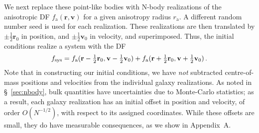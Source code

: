 \documentclass[fleqn,usenatbib]{mnras}
\begin{document}
We next replace these point-like bodies with N-body realizations of the anisotropic DF $f_\mathrm{a}(\mathbf{r}, \mathbf{v})$ for a given anisotropy radius $r_\mathrm{a}$. A different random number seed is used for each realization. These realizations are then translated by $\pm \frac{1}{2} \mathbf{r}_{0}$ in position, and $\pm \frac{1}{2} \mathbf{v}_{0}$ in velocity, and superimposed. Thus, the initial conditions realize a system with the DF
\begin{equation}
    f_\mathrm{sys} =
      f_\mathrm{a}(\mathbf{r} - \textstyle\frac{1}{2} \mathbf{r}_{0},
        \mathbf{v} - \textstyle\frac{1}{2} \mathbf{v}_{0}) +
      f_\mathrm{a}(\mathbf{r} + \textstyle\frac{1}{2} \mathbf{r}_{0},
        \mathbf{v} + \textstyle\frac{1}{2} \mathbf{v}_{0}) \, .
    \label{eq:sys_dist_func}
\end{equation}
Note that in constructing our initial conditions, we have \textit{not} subtracted centre-of-mass positions and velocities from the individual galaxy realizations. As noted in \S~\ref{sec:nbody}, bulk quantities have uncertainties due to Monte-Carlo statistics; as a result, each galaxy realization has an initial offset in position and velocity, of order $O(N^{-1/2})$, with respect to its assigned coordinates. While these offsets are small, they do have measurable consequences, as we show in Appendix~A.
\end{document}
